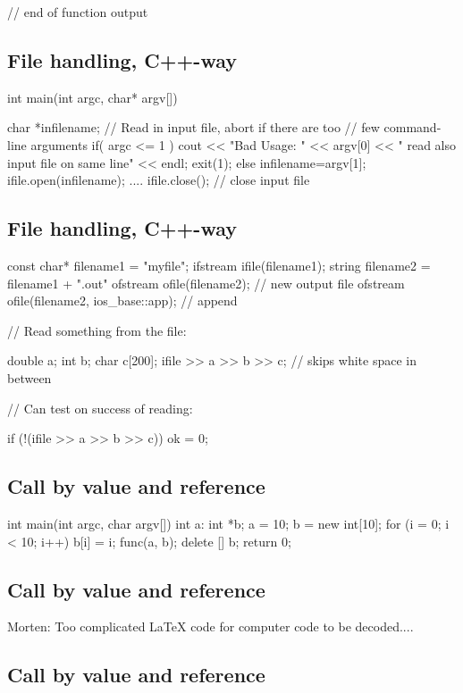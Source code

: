 \documentclass[%
oneside,                 %
final,                   %
10pt]{article}
\begin{document}
{{{{{}  // end of function output
\ecppcod

\subsection{File handling, C++-way}

\bcppcod
int main(int argc, char* argv[])
{
  char *infilename;
  // Read in input file, abort if there are too
  // few command-line arguments
  if( argc <= 1 ){
    cout << "Bad Usage: " << argv[0] <<
      " read also input file on same line" << endl;
    exit(1);
  }
  else{
    infilename=argv[1];
  }
  ifile.open(infilename);
  ....
  ifile.close();  // close input file
\ecppcod

\subsection{File handling, C++-way}

\bcppcod
const char* filename1 = "myfile";
ifstream ifile(filename1);
string filename2 = filename1 + ".out"
ofstream ofile(filename2);  // new output file
ofstream ofile(filename2, ios_base::app);  // append

//      Read something from the file:

double a; int b; char c[200];
ifile >> a >> b >> c;  // skips white space in between

//      Can test on success of reading:

if (!(ifile >> a >> b >> c)) ok = 0;
\ecppcod

\subsection{Call by value and reference}

\bcppcod
int main(int argc, char argv[]) {
int  a:
int *b;
a = 10;
b = new int[10];
for (i = 0; i < 10; i++) {
  b[i] = i;
}
func(a, b);
delete [] b;
return 0;
}
\ecppcod

\subsection{Call by value and reference}

Morten: Too complicated {\LaTeX} code for computer code to be
decoded....

\subsection{Call by value and reference}

}}}}}
\end{document}
